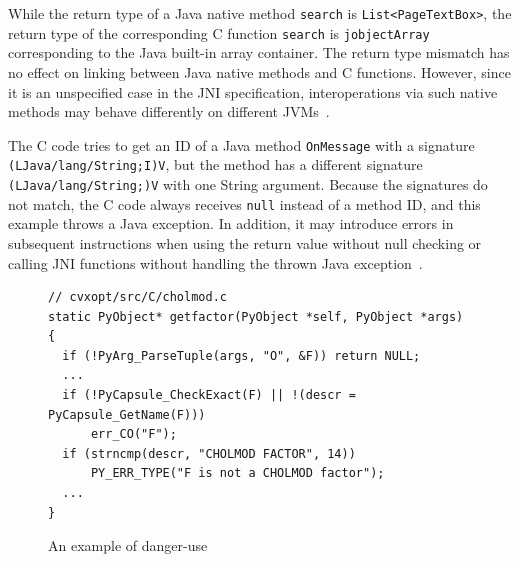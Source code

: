 While the return type of a Java native method {\tt search}
is {\tt List<PageTextBox>}, the return type of the corresponding C function
{\tt search} is {\tt jobjectArray} corresponding to the Java built-in array
container. The return type mismatch has no effect on linking between
Java native methods and C functions. However, since it is an unspecified case in
the JNI specification, interoperations via such native methods may behave
differently on different JVMs~\cite{LeeASE20}. 


The C code tries to get an ID of a Java method {\tt OnMessage} with a
signature \texttt{(LJava/lang/String;I)V}, but the method has a different
signature \texttt{(LJava/lang/String;)V} with one String argument. Because
the signatures do not match, the C code always receives {\tt null}
instead of a method ID, and this example throws a Java exception. In
addition, it may introduce errors in subsequent instructions when using the
return value without null checking or calling JNI functions without handling the
thrown Java exception~\cite{jniexcept}.






\begin{figure}[ht!]
  \centering
  \vspace{2mm}
  \begin{lstlisting}[style=cpp,xleftmargin=2.5em]
// cvxopt/src/C/cholmod.c
static PyObject* getfactor(PyObject *self, PyObject *args)
{
  if (!PyArg_ParseTuple(args, "O", &F)) return NULL;
  ...
  if (!PyCapsule_CheckExact(F) || !(descr = PyCapsule_GetName(F)))
      err_CO("F");
  if (strncmp(descr, "CHOLMOD FACTOR", 14))
      PY_ERR_TYPE("F is not a CHOLMOD factor");
  ...
}
  \end{lstlisting}
    \vspace*{-.5em}
  \caption{An example of danger-use}
  \label{fig:cvxopt}
\end{figure}

